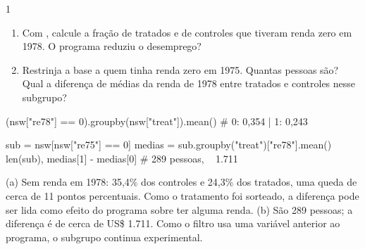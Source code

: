 \documentclass[lista]{tmlnotas}
\begin{document}
\begin{exercicio}{1}
\begin{enumerate}[label=(\alph*)]
  \item Com , calcule a fração de tratados e de controles que
        tiveram renda zero em 1978. O programa reduziu o desemprego?
  \item Restrinja a base a quem tinha renda zero em 1975. Quantas pessoas são?
        Qual a diferença de médias da renda de 1978 entre tratados e controles
        nesse subgrupo?
\end{enumerate}
\end{exercicio}
\begin{solucao}
\begin{codigo}
(nsw["re78"] == 0).groupby(nsw["treat"]).mean()   # 0: 0,354 | 1: 0,243

sub = nsw[nsw["re75"] == 0]
medias = sub.groupby("treat")["re78"].mean()
len(sub), medias[1] - medias[0]                    # 289 pessoas, ~ 1.711
\end{codigo}
(a) Sem renda em 1978: 35,4\% dos controles e 24,3\% dos tratados, uma queda
de cerca de 11 pontos percentuais. Como o tratamento foi sorteado, a diferença
pode ser lida como efeito do programa sobre ter alguma renda. (b) São 289
pessoas; a diferença é de cerca de US\$ 1.711. Como o filtro usa uma variável
anterior ao programa, o subgrupo continua experimental.
\end{solucao}
\end{document}
